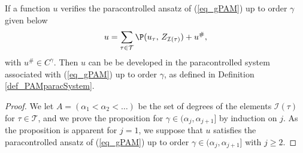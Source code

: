 \documentclass[11pt]{preprint}
\newcommand{\mcI}{\mathcal{I}}
\newcommand{\mcT}{\mathcal{T}}
\def\eqref#1{(\ref{#1})}
\begin{document}
	
	
	
	\begin{proposition}\label{prop_pamansatz_to_pamsystem}
		If a function $u$ verifies the paracontrolled ansatz of \eqref{eq_gPAM} up to order $\gamma$ given below
		\begin{equation*}
			\begin{aligned}
			u=\sum_{\tau\in\mcT} \P ( u_\tau , \, Z_{\mcI(\tau)} ) + u^\#,
	\end{aligned}
			\end{equation*}
				with $u^\#\in C^\gamma$.
		 Then $u$ can be be developed in the  paracontrolled system associated with \eqref{eq_gPAM} up to order $\gamma$, as defined in Definition \ref{def_PAMparacSystem}. 
	\end{proposition}
	\begin{proof}
		We let $A=(\alpha_1<\alpha_2<\dots)$ be the set of degrees of the elements $\mcI(\tau)$ for $\tau\in\mcT$, and we prove the proposition for $\gamma\in (\alpha_j,\alpha_{j+1}]$ by induction on $j$. As the proposition is apparent for $j=1$, we suppose that $u$ satisfies the paracontrolled ansatz of \eqref{eq_gPAM} up to order $\gamma\in(\alpha_j,\alpha_{j+1}]$ with $j\geq 2$. 
		

\end{proof}
\end{document}
